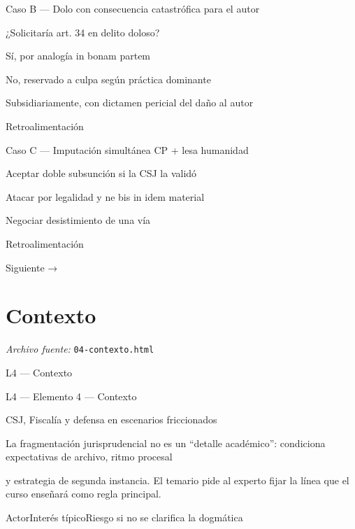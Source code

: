 \documentclass[11pt,a4paper]{article}
\begin{document}
      Caso B — Dolo con consecuencia catastrófica para el autor\par

      ¿Solicitaría art. 34 en delito doloso?\par

       Sí, por analogía in bonam partem\par
       No, reservado a culpa según práctica dominante\par
       Subsidiariamente, con dictamen pericial del daño al autor\par
      Retroalimentación\par





      Caso C — Imputación simultánea CP + lesa humanidad\par

       Aceptar doble subsunción si la CSJ la validó\par
       Atacar por legalidad y ne bis in idem material\par
       Negociar desistimiento de una vía\par
      Retroalimentación\par




    Siguiente →\par

\section{Contexto}
\noindent\textit{Archivo fuente:} \texttt{04-contexto.html}

L4 — Contexto\par





    L4 — Elemento 4 — Contexto\par
    CSJ, Fiscalía y defensa en escenarios friccionados\par


      La fragmentación jurisprudencial no es un “detalle académico”: condiciona expectativas de archivo, ritmo procesal\par
      y estrategia de segunda instancia. El temario pide al experto fijar la línea que el curso enseñará como regla principal.\par





          ActorInterés típicoRiesgo si no se clarifica la dogmática\par
\end{document}

